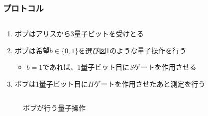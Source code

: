\begin{frame}
  \frametitle{プロトコル}

  \begin{columns}
    \begin{column}{0.6\textwidth}
      \begin{enumerate}
        \item ボブはアリスから3量子ビットを受けとる
        
        \item ボブは希望$b \in \{0, 1\}$を選び図\ref{fig:bob_circuit}のような量子操作を行う
        \begin{itemize}
          \item $b = 1$であれば、1量子ビット目に$S$ゲートを作用させる
        \end{itemize}

        \item ボブは1量子ビット目に$H$ゲートを作用させたあと測定を行う
      \end{enumerate}
    \end{column}
    \begin{column}{0.4\textwidth}
      \begin{table}[h]
        \CovertTable
      \end{table}
    \end{column}
  \end{columns}

  \begin{figure}
    \caption{ボブが行う量子操作}
    \label{fig:bob_circuit}
  \end{figure}
\end{frame}

